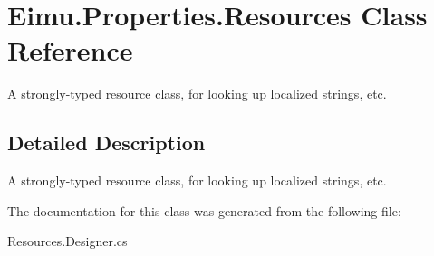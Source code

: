 \hypertarget{class_eimu_1_1_properties_1_1_resources}{
\section{Eimu.Properties.Resources Class Reference}
\label{class_eimu_1_1_properties_1_1_resources}
}


A strongly-\/typed resource class, for looking up localized strings, etc.  




\subsection{Detailed Description}
A strongly-\/typed resource class, for looking up localized strings, etc. 

The documentation for this class was generated from the following file:\begin{DoxyCompactItemize}
\item 
Resources.Designer.cs\end{DoxyCompactItemize}
